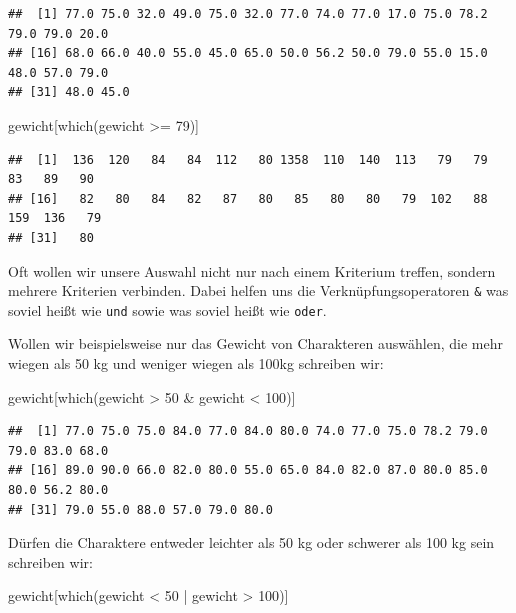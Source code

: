 \documentclass[
]{book}
\newenvironment{Shaded}{\begin{snugshade}}{\end{snugshade}}
\newcommand{\DecValTok}[1]{\textcolor[rgb]{0.00,0.00,0.81}{#1}}
\newcommand{\FunctionTok}[1]{\textcolor[rgb]{0.00,0.00,0.00}{#1}}
\newcommand{\NormalTok}[1]{#1}
\newcommand{\SpecialCharTok}[1]{\textcolor[rgb]{0.00,0.00,0.00}{#1}}
\begin{document}
\begin{verbatim}
##  [1] 77.0 75.0 32.0 49.0 75.0 32.0 77.0 74.0 77.0 17.0 75.0 78.2 79.0 79.0 20.0
## [16] 68.0 66.0 40.0 55.0 45.0 65.0 50.0 56.2 50.0 79.0 55.0 15.0 48.0 57.0 79.0
## [31] 48.0 45.0
\end{verbatim}

\begin{Shaded}
\begin{Highlighting}[]
\NormalTok{gewicht[}\FunctionTok{which}\NormalTok{(gewicht }\SpecialCharTok{\textgreater{}=} \DecValTok{79}\NormalTok{)]}
\end{Highlighting}
\end{Shaded}

\begin{verbatim}
##  [1]  136  120   84   84  112   80 1358  110  140  113   79   79   83   89   90
## [16]   82   80   84   82   87   80   85   80   80   79  102   88  159  136   79
## [31]   80
\end{verbatim}

Oft wollen wir unsere Auswahl nicht nur nach einem Kriterium treffen, sondern mehrere Kriterien verbinden. Dabei helfen uns die Verknüpfungsoperatoren \texttt{\&} was soviel heißt wie \texttt{und} sowie \texttt{\textbar{}} was soviel heißt wie \texttt{oder}.

Wollen wir beispielsweise nur das Gewicht von Charakteren auswählen, die mehr wiegen als 50 kg und weniger wiegen als 100kg schreiben wir:

\begin{Shaded}
\begin{Highlighting}[]
\NormalTok{gewicht[}\FunctionTok{which}\NormalTok{(gewicht }\SpecialCharTok{\textgreater{}} \DecValTok{50} \SpecialCharTok{\&}\NormalTok{ gewicht }\SpecialCharTok{\textless{}} \DecValTok{100}\NormalTok{)]}
\end{Highlighting}
\end{Shaded}

\begin{verbatim}
##  [1] 77.0 75.0 75.0 84.0 77.0 84.0 80.0 74.0 77.0 75.0 78.2 79.0 79.0 83.0 68.0
## [16] 89.0 90.0 66.0 82.0 80.0 55.0 65.0 84.0 82.0 87.0 80.0 85.0 80.0 56.2 80.0
## [31] 79.0 55.0 88.0 57.0 79.0 80.0
\end{verbatim}

Dürfen die Charaktere entweder leichter als 50 kg oder schwerer als 100 kg sein schreiben wir:

\begin{Shaded}
\begin{Highlighting}[]
\NormalTok{gewicht[}\FunctionTok{which}\NormalTok{(gewicht }\SpecialCharTok{\textless{}} \DecValTok{50} \SpecialCharTok{|}\NormalTok{ gewicht }\SpecialCharTok{\textgreater{}} \DecValTok{100}\NormalTok{)]}
\end{Highlighting}
\end{Shaded}
\end{document}
